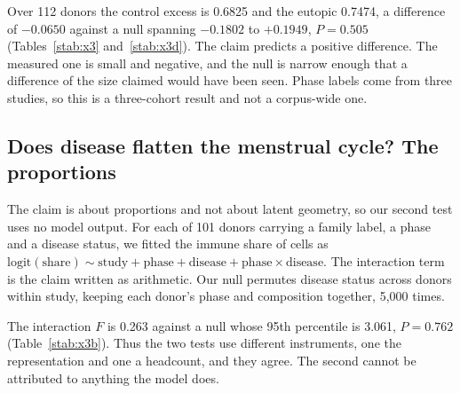 Over 112 donors the control excess is 0.6825 and the eutopic 0.7474, a
difference of $-0.0650$ against a null spanning $-0.1802$ to $+0.1949$,
$P = 0.505$ (Tables~\ref{stab:x3} and~\ref{stab:x3d}). The claim predicts a
positive difference. The measured one is small and negative, and the null
is narrow enough that a difference of the size claimed would have been
seen. Phase labels come from three studies, so this is a three-cohort
result and not a corpus-wide one.

\begin{table}[t]
\centering
\caption[X3, cycle agreement by disease]{\textbf{Cross-donor cycle
agreement among control donors and among eutopic donors.}}
\label{stab:x3}
\small

\end{table}

\begin{table}[t]
\centering
\caption[X3, the difference and its null]{\textbf{The difference between
the two groups and its permutation null.}}
\label{stab:x3d}
\small

\end{table}

\subsection{Does disease flatten the menstrual cycle? The proportions}

The claim is about proportions and not about latent geometry, so our second
test uses no model output. For each of 101 donors carrying a family label,
a phase and a disease status, we fitted the immune share of cells as
$\mathrm{logit}(\text{share}) \sim \text{study} + \text{phase} +
\text{disease} + \text{phase} \times \text{disease}$. The interaction term
is the claim written as arithmetic. Our null permutes disease status across
donors within study, keeping each donor's phase and composition together,
5{,}000 times.

The interaction $F$ is 0.263 against a null whose 95th percentile is 3.061,
$P = 0.762$ (Table~\ref{stab:x3b}). Thus the two tests use different
instruments, one the representation and one a headcount, and they agree.
The second cannot be attributed to anything the model does.

\begin{table}[t]
\centering
\caption[X3b, the interaction test]{\textbf{The phase-by-disease interaction
on immune composition}, 101 donors, study as a covariate.}
\label{stab:x3b}
\small

\end{table}

